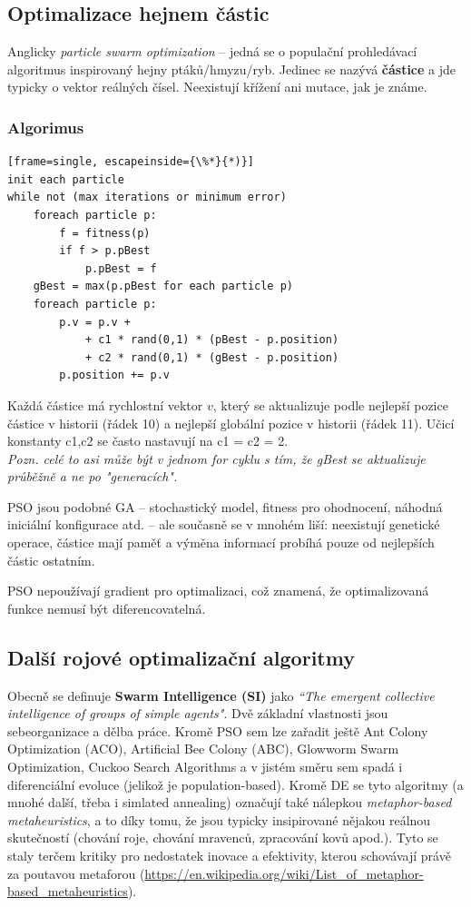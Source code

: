 \subsection{Optimalizace hejnem částic}
Anglicky \textit{particle swarm optimization} -- jedná se o populační prohledávací algoritmus inspirovaný hejny ptáků/hmyzu/ryb. Jedinec se nazývá \textbf{částice} a jde typicky o vektor reálných čísel. Neexistují křížení ani mutace, jak je známe.

\subsubsection{Algorimus}
\begin{minipage}{\linewidth}
	\begin{lstlisting}[frame=single, escapeinside={\%*}{*)}]
init each particle
while not (max iterations or minimum error)
	foreach particle p:
		f = fitness(p)
		if f > p.pBest
			p.pBest = f
	gBest = max(p.pBest for each particle p)			
	foreach particle p:
		p.v = p.v + 
			+ c1 * rand(0,1) * (pBest - p.position) 
			+ c2 * rand(0,1) * (gBest - p.position) 
		p.position += p.v		
	\end{lstlisting}
\end{minipage}

Každá částice má rychlostní vektor $v$, který se aktualizuje podle nejlepší pozice částice v historii (řádek 10) a nejlepší globální pozice v historii (řádek 11). Učicí konstanty c1,c2 se často nastavují na c1 = c2 = 2. \\
\textit{Pozn. celé to asi může být v jednom for cyklu s tím, že gBest se aktualizuje průběžně a ne po "generacích".}

PSO jsou podobné GA -- stochastický model, fitness pro ohodnocení, náhodná iniciální konfigurace atd. -- ale současně se v mnohém liší: neexistují genetické operace, částice mají paměť a výměna informací probíhá pouze od nejlepších částic ostatním. 

PSO nepoužívají gradient pro optimalizaci, což znamená, že optimalizovaná funkce nemusí být diferencovatelná.


\subsection{Další rojové optimalizační algoritmy}
Obecně se definuje \textbf{Swarm Intelligence (SI)} jako \textit{“The emergent collective intelligence of groups of simple agents"}. Dvě základní vlastnosti jsou sebeorganizace a dělba práce. Kromě PSO sem lze zařadit ještě Ant Colony Optimization (ACO), Artificial Bee Colony (ABC), Glowworm Swarm Optimization, Cuckoo Search Algorithms a v jistém směru sem spadá i diferenciální evoluce (jelikož je population-based). Kromě DE se tyto algoritmy (a mnohé další, třeba i simlated annealing)  označují také nálepkou \textit{metaphor-based metaheuristics}, a to díky tomu, že jsou typicky insipirované nějakou reálnou skutečností (chování roje, chování mravenců, zpracování kovů apod.). Tyto se staly terčem kritiky pro nedostatek inovace a efektivity, kterou schovávají právě za poutavou metaforou (\url{https://en.wikipedia.org/wiki/List_of_metaphor-based_metaheuristics}).

